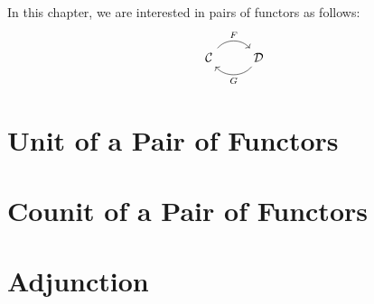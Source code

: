 In this chapter, we are interested in pairs of functors as follows:
    \[
        \begin{tikzcd}
              \Cat \arrow[r, "F", bend left  = 50, ""{name=U, below}]
            & \Dat \arrow[l, "G", bend left = 50, ""{name=D, above}]
        \end{tikzcd}
    \]
\section{Unit of a Pair of Functors}
    
\section{Counit of a Pair of Functors}
    
\section{Adjunction}
    
